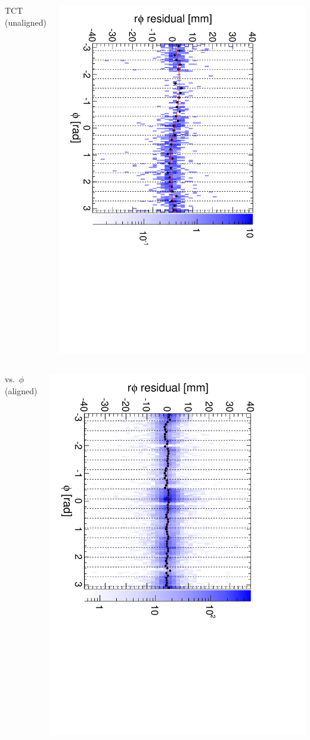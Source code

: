 \documentclass[compress]{beamer}
\begin{document}
\begin{frame}
\begin{columns}
\centering TCT (unaligned)

\includegraphics[height=\linewidth, angle=90]{diskiter01_m3to4_TST.pdf}
\end{columns}

\begin{columns}
\centering vs.\ $\phi$ (aligned)

\includegraphics[height=\linewidth, angle=90]{diskiter02_m3to4.pdf}


\end{columns}
\end{frame}
\end{document}
